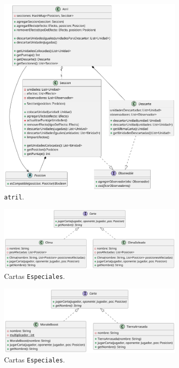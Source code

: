 \documentclass[titlepage,a4paper]{article}
\begin{document}
	\begin{figure}[H]
		\centering
		\includegraphics[width=0.8\textwidth]{diagramas/clases/Atril}
		\caption{\label{fig:class04}  \texttt{atril}.}
	\end{figure}


	\begin{figure}[H]
		\centering
		\includegraphics[width=0.8\textwidth]{diagramas/clases/Especiales1}
		\caption{\label{fig:class05} Cartas \texttt{Especiales}.}
	\end{figure}

	\begin{figure}[H]
		\centering
		\includegraphics[width=0.8\textwidth]{diagramas/clases/Especiales2}
		\caption{\label{fig:class052} Cartas \texttt{Especiales}.}
	\end{figure}
\end{document}

